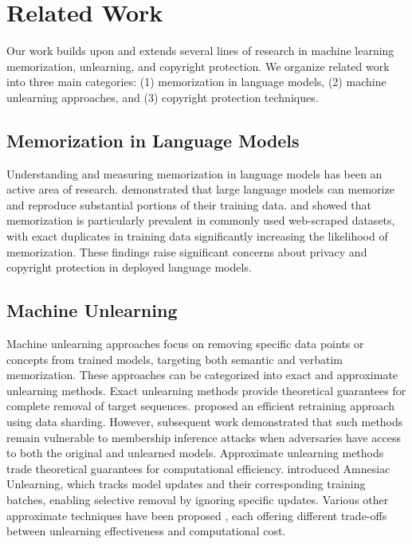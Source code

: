 \section{Related Work}
\label{sec:related}
Our work builds upon and extends several lines of research in machine learning memorization, unlearning, and copyright protection. We organize related work into three main categories: (1) memorization in language models, (2) machine unlearning approaches, and (3) copyright protection techniques.

\subsection{Memorization in Language Models}
Understanding and measuring memorization in language models has been an active area of research. \citet{CIJLTZ23,ZILJTC23} demonstrated that large language models can memorize and reproduce substantial portions of their training data. \citet{KWR22} and \citet{LINZECC22} showed that memorization is particularly prevalent in commonly used web-scraped datasets, with exact duplicates in training data significantly increasing the likelihood of memorization. These findings raise significant concerns about privacy and copyright protection in deployed language models.


\subsection{Machine Unlearning}
Machine unlearning approaches focus on removing specific data points or concepts from trained models, targeting both semantic and verbatim memorization. These approaches can be categorized into exact and approximate unlearning methods.
Exact unlearning methods provide theoretical guarantees for complete removal of target sequences. \citet{BCCJTZLP20} proposed an efficient retraining approach using data sharding. However, subsequent work\cite{CZWBHZ21} demonstrated that such methods remain vulnerable to membership inference attacks \cite{SSSS17,SZHBFB19} when adversaries have access to both the original and unlearned models.
Approximate unlearning methods trade theoretical guarantees for computational efficiency. \citet{GNG21} introduced Amnesiac Unlearning, which tracks model updates and their corresponding training batches, enabling selective removal by ignoring specific updates. Various other approximate techniques have been proposed \cite{GGHM23,GAS20,WHS22,MPSR22,ER23}, each offering different trade-offs between unlearning effectiveness and computational cost.


